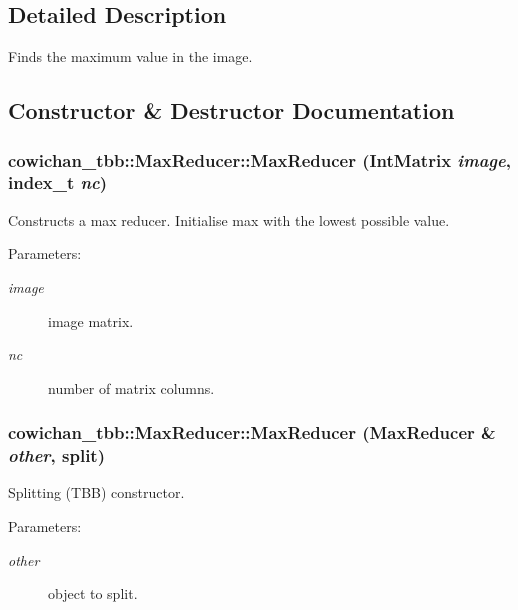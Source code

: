 \subsection{Detailed Description}
Finds the maximum value in the image. 

\subsection{Constructor \& Destructor Documentation}
\hypertarget{classcowichan__tbb_1_1_max_reducer_040700219bf9b280323932d458116a53}{
\subsubsection[{MaxReducer}]{\setlength{\rightskip}{0pt plus 5cm}cowichan\_\-tbb::MaxReducer::MaxReducer ({\bf IntMatrix} {\em image}, \/  {\bf index\_\-t} {\em nc})}}
\label{classcowichan__tbb_1_1_max_reducer_040700219bf9b280323932d458116a53}


Constructs a max reducer. Initialise max with the lowest possible value. \begin{Desc}
\item[Parameters:]
\begin{description}
\item[{\em image}]image matrix. \item[{\em nc}]number of matrix columns. \end{description}
\end{Desc}
\hypertarget{classcowichan__tbb_1_1_max_reducer_df02ca92e3124c21671407a220a8081e}{
\subsubsection[{MaxReducer}]{\setlength{\rightskip}{0pt plus 5cm}cowichan\_\-tbb::MaxReducer::MaxReducer ({\bf MaxReducer} \& {\em other}, \/  split)}}
\label{classcowichan__tbb_1_1_max_reducer_df02ca92e3124c21671407a220a8081e}


Splitting (TBB) constructor. \begin{Desc}
\item[Parameters:]
\begin{description}
\item[{\em other}]object to split. \end{description}
\end{Desc}


